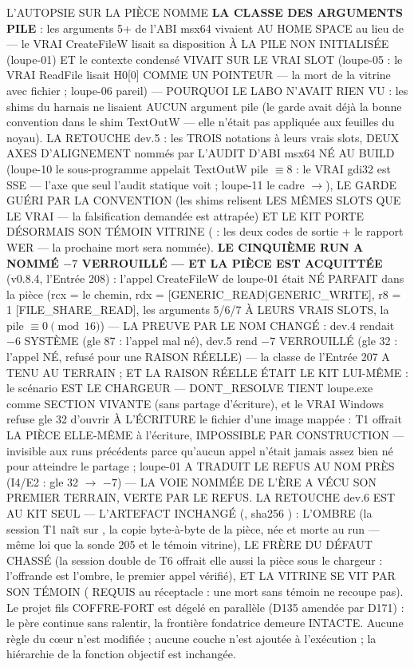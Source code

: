 L'AUTOPSIE SUR LA PIÈCE NOMME \textbf{LA CLASSE DES ARGUMENTS PILE} : les
arguments 5+ de l'ABI msx64 vivaient AU HOME SPACE \code{[rsp..0x18]} au lieu
de \code{[rsp+0x20]+} — le VRAI CreateFileW lisait sa disposition À LA PILE NON
INITIALISÉE (loupe-01) ET le contexte condensé VIVAIT SUR LE VRAI SLOT (loupe-05 :
le VRAI ReadFile lisait H0[0]  COMME UN POINTEUR — la mort de
la vitrine avec fichier ; loupe-06 pareil) — POURQUOI LE LABO N'AVAIT RIEN VU :
les shims du harnais ne lisaient AUCUN argument pile (le garde avait déjà la
bonne convention dans le shim TextOutW — elle n'était pas appliquée aux feuilles
du noyau). LA RETOUCHE dev.5 : les TROIS notations à leurs vrais slots, DEUX AXES
D'ALIGNEMENT nommés par L'AUDIT D'ABI msx64 NÉ AU BUILD (loupe-10 le
sous-programme  appelait TextOutW pile $\equiv 8$ : le VRAI
gdi32 est SSE — l'axe que seul l'audit statique voit ; loupe-11 le cadre
$\to$), LE GARDE GUÉRI PAR LA CONVENTION (les shims
relisent LES MÊMES SLOTS QUE LE VRAI — la falsification demandée est attrapée)
ET LE KIT PORTE DÉSORMAIS SON TÉMOIN VITRINE ( : les
deux codes de sortie + le rapport WER — la prochaine mort sera nommée).
\textbf{LE CINQUIÈME RUN A NOMMÉ $-7$ VERROUILLÉ — ET LA PIÈCE EST
ACQUITTÉE} (v0.8.4, l'Entrée 208) : l'appel CreateFileW de loupe-01 était
NÉ PARFAIT dans la pièce (rcx = le chemin, rdx = 
[GENERIC\_READ|GENERIC\_WRITE], r8 = 1 [FILE\_SHARE\_READ], les arguments
5/6/7 À LEURS VRAIS SLOTS, la pile $\equiv 0 \pmod{16}$) — LA PREUVE PAR LE
NOM CHANGÉ : dev.4 rendait $-6$ SYSTÈME (gle 87 : l'appel mal né),
dev.5 rend $-7$ VERROUILLÉ (gle 32 : l'appel NÉ, refusé pour une RAISON
RÉELLE) — la classe de l'Entrée 207 A TENU AU TERRAIN ; ET LA RAISON
RÉELLE ÉTAIT LE KIT LUI-MÊME : le scénario EST LE CHARGEUR —
 DONT\_RESOLVE TIENT loupe.exe comme SECTION VIVANTE
(sans partage d'écriture), et le VRAI Windows refuse gle 32 d'ouvrir À
L'ÉCRITURE le fichier d'une image mappée : T1 offrait LA PIÈCE ELLE-MÊME
à l'écriture, IMPOSSIBLE PAR CONSTRUCTION — invisible aux runs
précédents parce qu'aucun appel n'était jamais assez bien né pour
atteindre le partage ; loupe-01 A TRADUIT LE REFUS AU NOM PRÈS (I4/E2 :
gle 32 $\to$ $-7$) — LA VOIE NOMMÉE DE L'ÈRE A VÉCU SON PREMIER TERRAIN,
VERTE PAR LE REFUS. LA RETOUCHE dev.6 EST AU KIT SEUL — L'ARTEFACT
INCHANGÉ (, sha256 ) :
L'OMBRE (la session T1 naît sur , la copie
byte-à-byte de la pièce, née et morte au run — même loi que la sonde 205
et le témoin vitrine), LE FRÈRE DU DÉFAUT CHASSÉ (la session double de T6
offrait elle aussi la pièce sous le chargeur : l'offrande est l'ombre,
le premier appel vérifié), ET LA VITRINE SE VIT PAR SON TÉMOIN
( REQUIS au réceptacle : une mort sans témoin
ne recoupe pas). Le projet
fils COFFRE-FORT est dégelé en parallèle
(D135 amendée par D171) : le père continue sans ralentir, la frontière fondatrice
demeure INTACTE. Aucune règle du cœur n'est modifiée ; aucune couche n'est ajoutée
à l'exécution ; la hiérarchie de la fonction objectif est inchangée.


